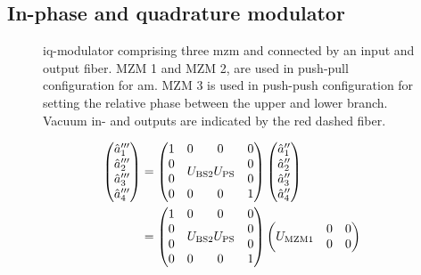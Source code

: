 \subsection{In-phase and quadrature modulator}

\begin{figure}[htb]
	\centering
	
	\caption{\gls{iq}-modulator comprising three \gls{mzm} and connected by an input and output fiber. MZM 1 and MZM 2, are used in push-pull configuration for \gls{am}. MZM 3 is used in push-push configuration for setting the relative phase between the upper and lower branch. Vacuum in- and outputs are indicated by the red dashed fiber.}
\end{figure}

\begin{equation}
	\begin{split}
		\begin{pmatrix}
			\hat{a}_1^{\prime\prime\prime} \\
			\hat{a}_2^{\prime\prime\prime} \\
			\hat{a}_3^{\prime\prime\prime} \\
			\hat{a}_4^{\prime\prime\prime}
		\end{pmatrix}
		&=
		\begin{pmatrix}
			 1 & 0 & 0 & 0 \\
			 0 & \multicolumn{2}{c}{\multirow{2}{*}{$U_\text{BS2}U_\text{PS}$}} & 0 \\
			 0 & & & 0 \\
			 0 & 0 & 0 & 1
		\end{pmatrix}
		\begin{pmatrix}
			\hat{a}_1^{\prime\prime} \\
			\hat{a}_2^{\prime\prime} \\
			\hat{a}_3^{\prime\prime} \\
			\hat{a}_4^{\prime\prime}
		\end{pmatrix}
		\\
		&=
		\begin{pmatrix}
			 1 & 0 & 0 & 0 \\
			 0 & \multicolumn{2}{c}{\multirow{2}{*}{$U_\text{BS2}U_\text{PS}$}} & 0 \\
			 0 & & & 0 \\
			 0 & 0 & 0 & 1
		\end{pmatrix}
		\begin{pmatrix}
			 \multicolumn{2}{c}{\multirow{2}{*}{$U_\text{MZM1}$}} & 0 & 0 \\
			 & & 0 & 0 \\

\end{pmatrix}
\end{split}
\end{equation}

